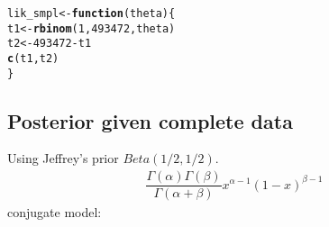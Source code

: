 \documentclass{article}\usepackage[]{graphicx}\usepackage[]{xcolor}
\makeatletter
\newcommand{\hlnum}[1]{\textcolor[rgb]{0.686,0.059,0.569}{#1}}%
\newcommand{\hlopt}[1]{\textcolor[rgb]{0,0,0}{#1}}%
\newcommand{\hlstd}[1]{\textcolor[rgb]{0.345,0.345,0.345}{#1}}%
\newcommand{\hlkwa}[1]{\textcolor[rgb]{0.161,0.373,0.58}{\textbf{#1}}}%
\newcommand{\hlkwb}[1]{\textcolor[rgb]{0.69,0.353,0.396}{#1}}%
\newcommand{\hlkwc}[1]{\textcolor[rgb]{0.333,0.667,0.333}{#1}}%
\newcommand{\hlkwd}[1]{\textcolor[rgb]{0.737,0.353,0.396}{\textbf{#1}}}%
\newenvironment{kframe}{%
 \def\at@end@of@kframe{}%
 \ifinner\ifhmode%
  \def\at@end@of@kframe{\end{minipage}}%
  \begin{minipage}{\columnwidth}%
 \fi\fi%
 \def\FrameCommand##1{\hskip\@totalleftmargin \hskip-\fboxsep
 \colorbox{shadecolor}{##1}\hskip-\fboxsep
     \hskip-\linewidth \hskip-\@totalleftmargin \hskip\columnwidth}%
 \MakeFramed {\advance\hsize-\width
   \@totalleftmargin\z@ \linewidth\hsize
   \@setminipage}}%
 {\par\unskip\endMakeFramed%
 \at@end@of@kframe}
\newenvironment{knitrout}{}{} %
\theoremstyle{definition}
\makeatother
\begin{document}
\begin{knitrout}
\color{fgcolor}\begin{kframe}
\begin{alltt}
\hlstd{lik_smpl} \hlkwb{<-} \hlkwa{function}\hlstd{(}\hlkwc{theta}\hlstd{) \{}
  \hlstd{t1} \hlkwb{<-} \hlkwd{rbinom}\hlstd{(}\hlnum{1}\hlstd{,} \hlnum{493472}\hlstd{, theta)}
  \hlstd{t2} \hlkwb{<-} \hlnum{493472} \hlopt{-} \hlstd{t1}
  \hlkwd{c}\hlstd{(t1,t2)}
\hlstd{\}}
\end{alltt}
\end{kframe}
\end{knitrout}

\subsection*{Posterior given complete data}
Using Jeffrey's prior $Beta(1/2,1/2)$.
\begin{align*}
\dfrac{\Gamma(\alpha)\Gamma(\beta)}{\Gamma(\alpha + \beta)}x^{\alpha -1}(1-x)^{\beta-1}
\end{align*}
conjugate model:




\nocite{*}


\end{document}
